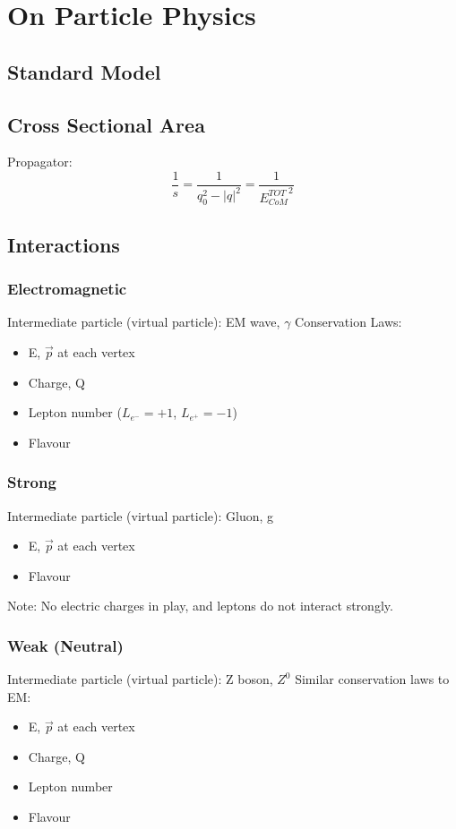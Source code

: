 \documentclass[11pt,a4paper]{article}
\begin{document}

\section{On Particle Physics}
\subsection{Standard Model}
\subsection{Cross Sectional Area}Propagator:
\begin{equation}
    \frac{1}{s} = \frac{1}{q_0^2 - |q|^2} = \frac{1}{{E^{TOT}_{CoM}}^2}
\end{equation}

\subsection{Interactions}
\subsubsection{Electromagnetic}
Intermediate particle (virtual particle): EM wave, $\gamma$
Conservation Laws:
\begin{itemize}
    \item E, $\vec{p}$ at each vertex
    \item Charge, Q
    \item Lepton number ($L_{e^-} = +1$, $L_{e^+} = -1$)
    \item Flavour
\end{itemize}

\subsubsection{Strong}
Intermediate particle (virtual particle): Gluon, g
\begin{itemize}
    \item E, $\vec{p}$ at each vertex
    \item Flavour
\end{itemize}
Note: No electric charges in play, and leptons do not interact strongly.

\subsubsection{Weak (Neutral)}
Intermediate particle (virtual particle): Z boson, $Z^0$
Similar conservation laws to EM:
\begin{itemize}
    \item E, $\vec{p}$ at each vertex
    \item Charge, Q
    \item Lepton number
    \item Flavour
\end{itemize}
\end{document}
